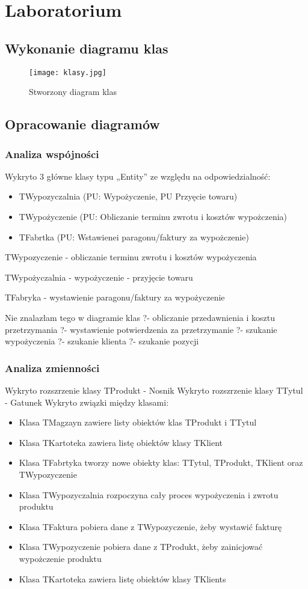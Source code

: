 \documentclass{article}
\begin{document}
	\section{Laboratorium}
	\subsection{Wykonanie diagramu klas}
\begin{figure}[!ht]
	\centering
	\texttt{[image: klasy.jpg]}
	\caption{Stworzony diagram klas}
	\label{fig:obrazek 1}
\end{figure}
	\newpage
	\subsection{Opracowanie diagramów}
	\subsubsection{Analiza wspójności}
	Wykryto 3 główne klasy typu „Entity” ze względu na odpowiedzialność:
	\begin{itemize}
	\item TWypozyczalnia (PU: Wypożyczenie, PU Przyęcie towaru)
	\item TWypożyczenie (PU: Obliczanie terminu zwrotu i kosztów wypożczenia)
	\item TFabrtka (PU: Wstawienei paragonu/faktury za wypożczenie)
	\end{itemize}	
TWypozyczenie
- obliczanie terminu zwrotu i kosztów wypożyczenia

TWypożyczalnia
- wypożyczenie
- przyjęcie towaru

TFabryka
- wystawienie paragonu/faktury za wypożyczenie

Nie znalazłam tego w diagramie klas
?- obliczanie przedawnienia i kosztu przetrzymania
?- wystawienie potwierdzenia za przetrzymanie
?- szukanie wypożyczenia
?- szukanie klienta
?- szukanie pozycji
\subsubsection{Analiza zmienności}
Wykryto rozszrzenie klasy TProdukt - Nosnik
Wykryto rozszrzenie klasy TTytul - Gatunek
Wykryto związki między klasami:
\begin{itemize}
	\item Klasa TMagzayn zawiere listy obiektów klas TProdukt i TTytul
	\item Klasa TKartoteka zawiera listę obiektów klasy TKlient
	\item Klasa TFabrtyka tworzy nowe obiekty klas: TTytul, TProdukt, TKlient oraz TWypozyczenie
	\item Klasa TWypozyczalnia rozpoczyna cały proces wypożyczenia i zwrotu produktu
	\item Klasa TFaktura pobiera dane z TWypozyczenie, żeby wystawić fakturę
	\item Klasa TWypozyczenie pobiera dane z TProdukt, żeby zainicjować wypożczenie produktu
	\item Klasa TKartoteka zawiera listę obiektów klasy TKlients
\end{itemize}	
\end{document}

